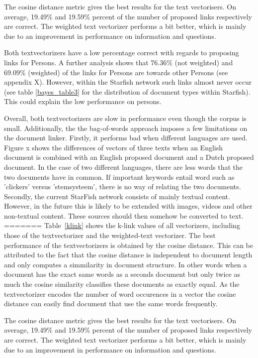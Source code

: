 The cosine distance metric gives the best results for the text vectorisers. On average, 19.49\% and 19.59\% percent of the number of proposed links respectively are correct. The weighted text vectorizer performs a bit better, which is mainly due to an improvement in performance on information and questions. %

Both textvectorizers have a low percentage correct with regards to proposing links for Persons. A further analysis shows that 76.36\% (not weighted) and 69.09\% (weighted) of the links for Persons are towards other Persons (see appendix X). However, within the Starfish network such links almost never occur (see table \ref{bayes_table3} for the distribution of document types within Starfish). This could explain the low performance on persons. 

Overall, both textvectorizers are slow in performance even though the corpus is small. Additionally, the the bag-of-words approach imposes a few limitations on the document linker. Firstly, it performs bad when different languages are used. Figure x shows the differences of vectors of three texts when an English document is combined with an English proposed document and a Dutch proposed document. In the case of two different languages, there are less words that the two documents have in common. If important keywords entail word such as 'clickers' versus 'stemsysteem', there is no way of relating the two documents. Secondly, the current StarFish network consists of mainly textual content. However, in the future this is likely to be extended with images, videos and other non-textual content. These sources should then somehow be converted to text.
=======
Table~\ref{klink} shows the k-link values of all vectorizers, including those
of the textvectorizer and the weighted-text vectorizer. The best performance of
the textvectorizers is obtained by the cosine distance. This can be
attributed to the fact that the cosine distance is independent to document
length and only computes a simmilarity in document structure. In other words
when a document has the exact same words as a seconds document but only twice
as much the cosine similarity classifies these documents as exactly equal. As
the textvectorizer encodes the number of word occurences in a vector the
cosine distance can  easily find document that use the same words frequently.

The cosine distance metric gives the best results for the text vectorisers. On
average, 19.49\% and 19.59\% percent of the number of proposed links
respectively are correct. The weighted text vectorizer performs a bit better,
which is mainly due to an improvement in performance on information and
questions. %

